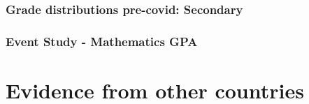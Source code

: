 \documentclass{beamer}
\begin{document}
\begin{frame}
    \label{update_scott}
    \frametitle{Grade distributions pre-covid: Secondary}
 {
    }
\end{frame}


\begin{frame}
    \label{update_scott}
    \frametitle{Event Study - Mathematics GPA}
        {
    }
\end{frame}



\section{Evidence from other countries}
\end{document}

